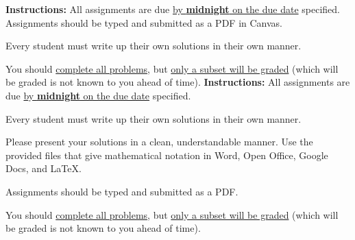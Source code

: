 
\extrawidth{0.5in} \extrafootheight{-0in} \pagestyle{headandfoot}
\headrule {} \footrule {}


\ifprintanswers
\noindent \textbf{Instructions:} All assignments are due \underline{by \textbf{midnight} on the due date} specified.  Assignments should be typed and submitted as a PDF in Canvas.   

\medskip
\noindent Every student must write up their own solutions in their own manner.

\medskip
\noindent You should \underline{complete all problems}, but \underline{only a subset will be graded} (which will be graded is not known to you ahead of time). 
\else
\noindent \textbf{Instructions:} All assignments are due \underline{by \textbf{midnight} on the due date} specified.  

\medskip
\noindent Every student must write up their own solutions in their own manner.

\medskip
\noindent Please present your solutions in a clean, understandable
manner.  Use the provided files that give mathematical notation in Word, Open Office, Google Docs, and \LaTeX. 

\medskip
\noindent Assignments should be typed and submitted as a PDF.   

\medskip
\noindent You should \underline{complete all problems}, but \underline{only a subset will be graded} (which will be graded is not known to you ahead of time). 
\fi


